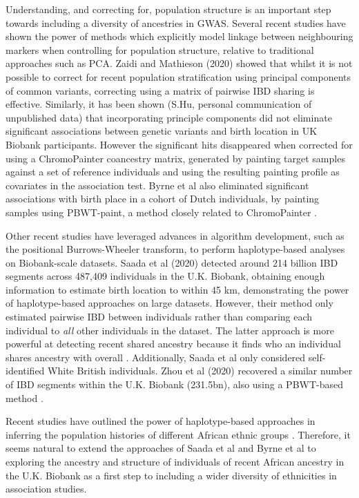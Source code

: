 Understanding, and correcting for, population structure is an important step towards including a diversity of ancestries in GWAS. Several recent studies have shown the power of methods which explicitly model linkage between neighbouring markers when controlling for population structure, relative to traditional approaches such as PCA. Zaidi and Mathieson (2020) \cite{zaidi2020demographic} showed that whilst it is not possible to correct for recent population stratification using principal components of common variants, correcting using a matrix of pairwise IBD sharing is effective. Similarly, it has been shown (S.Hu, personal communication of unpublished data) that incorporating principle components did not eliminate significant associations between genetic variants and birth location in UK Biobank participants. However the significant hits disappeared when corrected for using a ChromoPainter coancestry matrix, generated by painting target samples against a set of reference individuals and using the resulting painting profile as covariates in the association test. Byrne et al also eliminated significant associations with birth place in a cohort of Dutch individuals, by painting samples using PBWT-paint, a method closely related to ChromoPainter \cite{byrne2020dutch}. 

Other recent studies have leveraged advances in algorithm development, such as the positional Burrows-Wheeler transform, to perform haplotype-based analyses on Biobank-scale datasets. Saada et al (2020) detected around 214 billion IBD segments across 487,409 individuals in the U.K. Biobank, obtaining enough information to estimate birth location to within 45 km, demonstrating the power of haplotype-based approaches on large datasets. However, their method only estimated pairwise IBD between individuals rather than comparing each individual to \textit{all} other individuals in the dataset. The latter approach is more powerful at detecting recent shared ancestry because it finds who an individual shares ancestry with overall \cite{LawsonFalushReview}. Additionally, Saada et al only considered self-identified White British individuals. Zhou et al (2020) recovered a similar number of IBD segments within the U.K. Biobank (231.5bn), also using a PBWT-based method \cite{ZHOU2020426}.


Recent studies have outlined the power of haplotype-based approaches in inferring the population histories of different African ethnic groups \cite{lopez2021evidence, StructureEthiopians2021, gurdasani2019uganda}. Therefore, it seems natural to extend the approaches of Saada et al and Byrne et al to exploring the ancestry and structure of individuals of recent African ancestry in the U.K. Biobank as a first step to including a wider diversity of ethnicities in association studies. 

